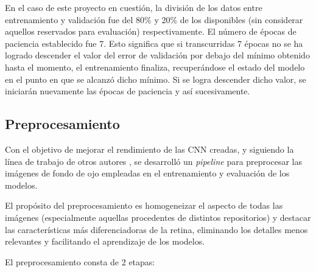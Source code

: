 En el caso de este proyecto en cuestión, la división de los datos entre entrenamiento y validación fue del 80\% y 20\% de los disponibles (sin considerar aquellos reservados para evaluación) respectivamente. El número de épocas de paciencia establecido fue 7. Esto significa que si transcurridas 7 épocas no se ha logrado descender el valor del error de validación por debajo del mínimo obtenido hasta el momento, el entrenamiento finaliza, recuperándose el estado del modelo en el punto en que se alcanzó dicho mínimo. Si se logra descender dicho valor, se iniciarán nuevamente las épocas de paciencia y así sucesivamente.

\subsection{Preprocesamiento}

Con el objetivo de mejorar el rendimiento de las CNN creadas, y siguiendo la línea de trabajo de otros autores \cite{preproc:detection, preproc:maison}, se desarrolló un \textit{pipeline} para preprocesar las imágenes de fondo de ojo empleadas en el entrenamiento y evaluación de los modelos.

El propósito del preprocesamiento es homogeneizar el aspecto de todas las imágenes (especialmente aquellas procedentes de distintos repositorios) y destacar las características más diferenciadoras de la retina, eliminando los detalles menos relevantes y facilitando el aprendizaje de los modelos. 

El preprocesamiento consta de 2 etapas:

